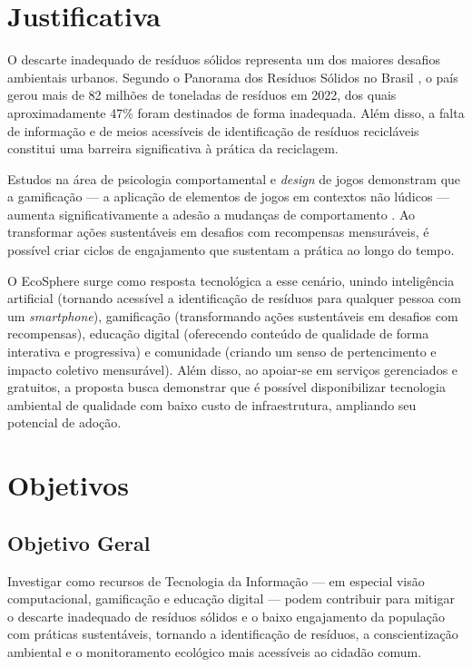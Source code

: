 \documentclass[
	12pt,
	openright,
	oneside,
	a4paper,
	chapter=TITLE,
	section=TITLE,
	subsection=TITLE,
	subsubsection=TITLE,
	english,
	brazil
	]{abntex2}
\begin{document}
\section{Justificativa}

O descarte inadequado de resíduos sólidos representa um dos maiores desafios ambientais urbanos. Segundo o Panorama dos Resíduos Sólidos no Brasil \cite{ABRELPE2022}, o país gerou mais de 82 milhões de toneladas de resíduos em 2022, dos quais aproximadamente 47\% foram destinados de forma inadequada. Além disso, a falta de informação e de meios acessíveis de identificação de resíduos recicláveis constitui uma barreira significativa à prática da reciclagem.

Estudos na área de psicologia comportamental e \textit{design} de jogos demonstram que a gamificação — a aplicação de elementos de jogos em contextos não lúdicos — aumenta significativamente a adesão a mudanças de comportamento \cite{HAMARI2014}. Ao transformar ações sustentáveis em desafios com recompensas mensuráveis, é possível criar ciclos de engajamento que sustentam a prática ao longo do tempo.

O EcoSphere surge como resposta tecnológica a esse cenário, unindo inteligência artificial (tornando acessível a identificação de resíduos para qualquer pessoa com um \textit{smartphone}), gamificação (transformando ações sustentáveis em desafios com recompensas), educação digital (oferecendo conteúdo de qualidade de forma interativa e progressiva) e comunidade (criando um senso de pertencimento e impacto coletivo mensurável). Além disso, ao apoiar-se em serviços gerenciados e gratuitos, a proposta busca demonstrar que é possível disponibilizar tecnologia ambiental de qualidade com baixo custo de infraestrutura, ampliando seu potencial de adoção.

\section{Objetivos}

\subsection{Objetivo Geral}

Investigar como recursos de Tecnologia da Informação — em especial visão computacional, gamificação e educação digital — podem contribuir para mitigar o descarte inadequado de resíduos sólidos e o baixo engajamento da população com práticas sustentáveis, tornando a identificação de resíduos, a conscientização ambiental e o monitoramento ecológico mais acessíveis ao cidadão comum.
\end{document}
